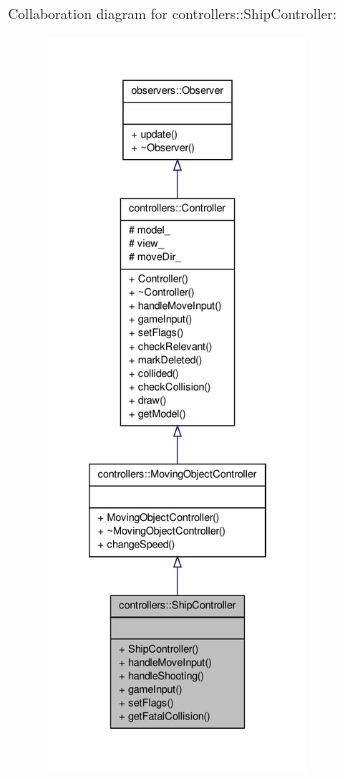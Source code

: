 \-Collaboration diagram for controllers\-:\-:\-Ship\-Controller\-:
\nopagebreak
\begin{figure}[H]
\begin{center}
\leavevmode
\includegraphics[height=550pt]{d7/dc1/classcontrollers_1_1ShipController__coll__graph}
\end{center}
\end{figure}
